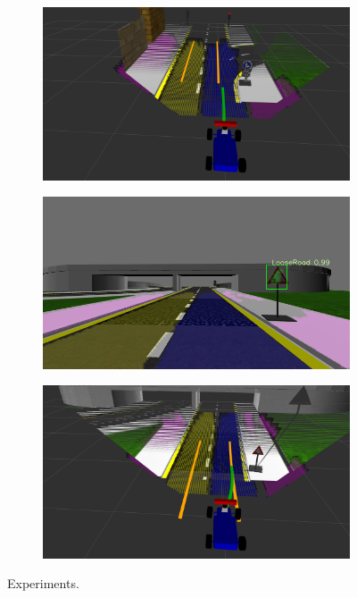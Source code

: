 \begin{figure}[h]
\begin{subfigure}[b]{0.45\linewidth}
  \end{subfigure}
  \begin{subfigure}[b]{0.45\linewidth}
      \includegraphics[width=\linewidth]{figures/experiments/straight-or-right-pc.png}
  \end{subfigure}
  \begin{subfigure}[b]{0.45\linewidth}
      \includegraphics[width=\linewidth]{figures/experiments/loose-road-img.png}
  \end{subfigure}
  \begin{subfigure}[b]{0.45\linewidth}
      \includegraphics[width=\linewidth]{figures/experiments/loose-road-pc.png}
  \end{subfigure}
  \caption{Experiments.}
  \label{figure:normal-driving}
\end{figure}

